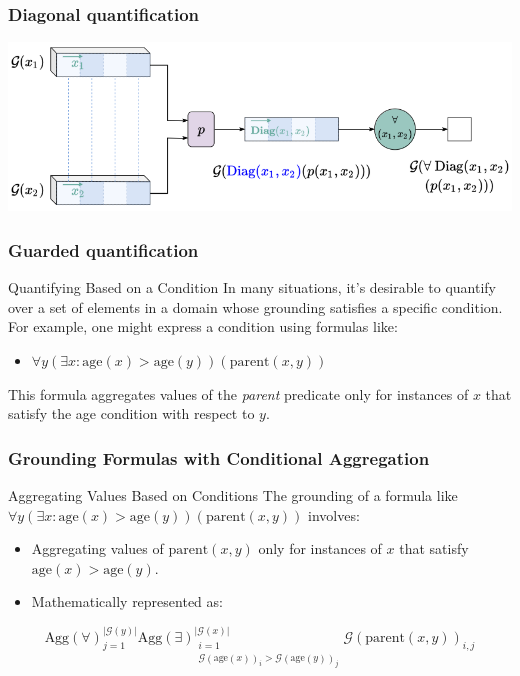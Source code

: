 \documentclass{beamer}
\newcommand{\G}{\mathcal{G}}
\begin{document}
\begin{frame}
  \frametitle{Diagonal quantification}
  \includegraphics[width=\textwidth]{ltn4.png}
\end{frame}

\begin{frame}
\frametitle{Guarded quantification}
\begin{block}{Quantifying Based on a Condition}
In many situations, it's desirable to quantify over a set of elements
in a domain whose grounding satisfies a specific condition. For
example, one might express a condition using formulas like:
\begin{itemize}
    \item \( \forall y (\exists x : \text{age}(x) > \text{age}(y)) (\text{parent}(x, y)) \)
\end{itemize}
This formula aggregates values of the \textit{parent} predicate only for instances of \( x \) that satisfy the age condition with respect to \( y \).
\end{block}
\end{frame}

\begin{frame}
\frametitle{Grounding Formulas with Conditional Aggregation}
\begin{block}{Aggregating Values Based on Conditions}
The grounding of a formula like \( \forall y (\exists x: \text{age}(x) > \text{age}(y)) (\text{parent}(x, y)) \) involves:
\begin{itemize}
    \item Aggregating values of \( \text{parent}(x, y) \) only for instances of \( x \) that satisfy \( \text{age}(x) > \text{age}(y) \).
    \item Mathematically represented as:
\end{itemize}
\[
\text{Agg}({\forall})_{j=1}^{|\G(y)|} \text{Agg}({\exists})_{\substack{i=1 \\ \G(\text{age}(x))_i > \G(\text{age}(y))_j}}^{|\G(x)|} \G(\text{parent}(x, y))_{i,j}
\]
\end{block}
\end{frame}
\end{document}
